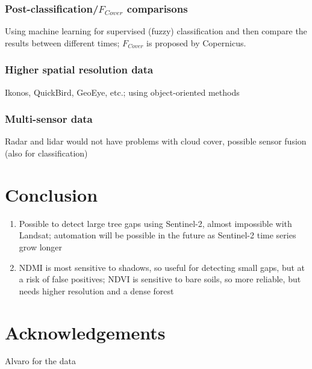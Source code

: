 \documentclass[a4paper,12pt]{scrbook}
\begin{document}
\subsection{Post-classification/$F_{Cover}$ comparisons}

Using machine learning for supervised (fuzzy) classification and then compare the results between different times; $F_{Cover}$ is proposed by Copernicus.

\subsection{Higher spatial resolution data}

Ikonos, QuickBird, GeoEye, etc.; using object-oriented methods

\subsection{Multi-sensor data}

Radar and lidar would not have problems with cloud cover, possible sensor fusion (also for classification)

\chapter{Conclusion}

\begin{enumerate}
 \item Possible to detect large tree gaps using Sentinel-2, almost impossible with Landsat; automation will be possible in the future as Sentinel-2 time series grow longer
 \item \ac{NDMI} is most sensitive to shadows, so useful for detecting small gaps, but at a risk of false positives; \ac{NDVI} is sensitive to bare soils, so more reliable, but needs higher resolution and a dense forest
\end{enumerate}

\chapter{Acknowledgements}

Alvaro for the data

\printnoidxglossary[type=acronym]


\end{document}

